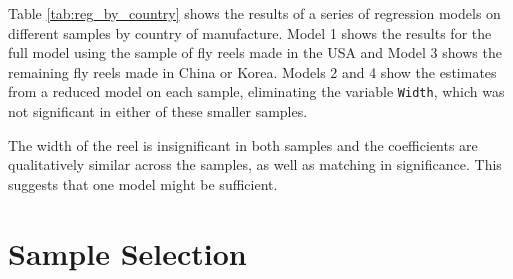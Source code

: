 Table \ref{tab:reg_by_country} shows the results of 
a series of regression models 
on different samples by country of manufacture.
Model 1 shows the results 
for the full model
using the sample of fly reels made in the USA
and Model 3 shows the remaining fly reels made in China or Korea.
Models 2 and 4 show the estimates from a reduced model
on each sample, eliminating the variable \texttt{Width}, 
which was not significant in either of these smaller samples.



The width of the reel is insignificant in both samples
and the coefficients are qualitatively similar across the samples, as well as matching in significance. 
This suggests that one model might be sufficient. 

%
%
%



\clearpage
\section{Sample Selection}


